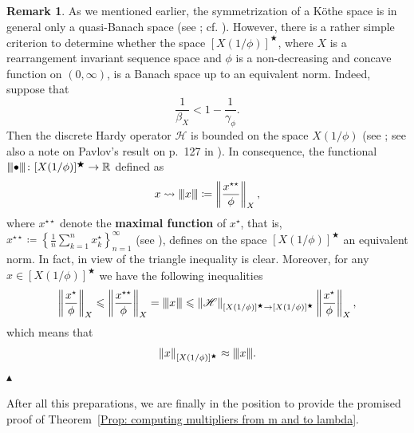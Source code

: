 \documentclass[11pt]{amsart}
\theoremstyle{definition}
\theoremstyle{definition}
\theoremstyle{definition}
\theoremstyle{definition}
\theoremstyle{definition}
\theoremstyle{definition}
\newtheorem{remark}[theorem]{Remark}
\theoremstyle{definition}
\theoremstyle{definition}
\numberwithin{equation}{section}
\numberwithin{equation}{section}
\numberwithin{equation}{section}
\theoremstyle{definition}
\theoremstyle{definition}
\theoremstyle{definition}
\theoremstyle{definition}
\theoremstyle{definition}
\theoremstyle{definition}
\newcommand{\norm}[1]{\left\lVert#1\right\rVert}
\newcommand{\vertiii}[1]{{\left\vert\kern-0.25ex\left\vert\kern-0.25ex\left\vert #1 
		\right\vert\kern-0.25ex\right\vert\kern-0.25ex\right\vert}}
\newcommand\xqed[1]{%
	\leavevmode\unskip\penalty9999 \hbox{}\nobreak\hfill
	\quad\hbox{#1}}
\newcommand\demo{\xqed{{\Large $\blacktriangle$}}}
\begin{document}
		\begin{remark}
			As we mentioned earlier, the symmetrization of a K{\" o}the space is in general only a quasi-Banach space (see \cite[Lemma~1.4]{KR09}; cf. \cite[Corollary~1]{KLM19}).
			However, there is a rather simple criterion to determine whether the space $[X(1/\phi)]^{\bigstar}$, where $X$ is a rearrangement invariant sequence space
			and $\phi$ is a non-decreasing and concave function on $(0,\infty)$, is a Banach space up to an equivalent norm. Indeed, suppose that
			\begin{equation*}
				\frac{1}{\beta_X} < 1 - \frac{1}{\gamma_{\phi}}.
			\end{equation*}
			Then the discrete Hardy operator $\mathscr{H}$ is bounded on the space $X(1/\phi)$ (see \cite[Theorem~1]{Mal83};
			see also a note on Pavlov's result on p.~127 in \cite{KMP07}).
			In consequence, the functional $\vertiii{\bullet} \colon [X(1/\phi)]^{\bigstar} \rightarrow \mathbb{R}$ defined as
			\begin{equation*}
				x \rightsquigarrow \vertiii{x}\coloneqq \norm{\frac{x^{\star\star}}{\phi}}_X,
			\end{equation*}
			where $x^{\star \star}$ denote the {\bf maximal function} of $x^{\star}$, that is,
			$x^{\star\star} \coloneqq \left\{ \frac{1}{n} \sum_{k=1}^{n} x^{\star}_k \right\}_{n=1}^{\infty}$
			(see \cite[Definition~3.1, p.~52]{BS88}), defines on the space $[X(1/\phi)]^{\bigstar}$ an equivalent norm.
			In fact, in view of \cite[p.~54]{BS88} the triangle inequality is clear.
			Moreover, for any $x \in [X(1/\phi)]^{\bigstar}$ we have the following inequalities
			\begin{equation*}
				\norm{\frac{x^{\star}}{\phi}}_X
					\leqslant \norm{\frac{x^{\star\star}}{\phi}}_{X}
					= \vertiii{x}
					\leqslant \norm{\mathscr{H}}_{[X(1/\phi)]^{\bigstar} \rightarrow [X(1/\phi)]^{\bigstar}} \norm{\frac{x^{\star}}{\phi}}_X,
			\end{equation*}
			which means that
			\begin{equation*}
				\norm{x}_{[X(1/\phi)]^{\bigstar}} \approx \vertiii{x}.
			\end{equation*}
			\demo
		\end{remark}
		
		After all this preparations, we are finally in the position to provide the promised proof of Theorem~\ref{Prop: computing multipliers from m and to lambda}.
		
\end{document}
